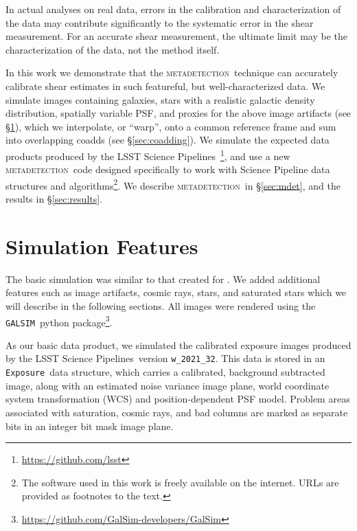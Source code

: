 \documentclass[twocolumn,twocolappendix,astrosym]{openjournal}
\newcommand{\galsim}{\texttt{GALSIM}}
\newcommand{\calexp}{\texttt{Exposure}}
\newcommand{\dm}{LSST Science Pipelines}
\newcommand{\mdet}{\textsc{metadetection}}
\begin{document}
In actual analyses on real data, errors in the calibration and characterization
of the data may contribute significantly to the systematic error in the shear
measurement.  For an accurate shear measurement, the ultimate limit may be the
characterization of the data, not the method itself.

In this work we demonstrate that the \mdet\ technique can accurately calibrate
shear estimates in such featureful, but well-characterized data.  We simulate
images containing galaxies, stars with a realistic galactic density
distribution, spatially variable PSF, and proxies for the above image artifacts
(see \S \ref{sec:sim}), which we interpolate, or ``warp'', onto a common
reference frame and sum into overlapping coadds (see \S \ref{sec:coadding}).
We simulate the expected data products produced by the \dm\
\citep{BoschLSST2019,BoschHSC2017}\footnote{\url{https://github.com/lsst}}, and
use a new \mdet\ code designed specifically to work with Science Pipeline data
structures and algorithms\footnote{The software used in this work is freely
available on the internet.  URLs are provided as footnotes to the text.}.  We
describe \mdet\ in \S \ref{sec:mdet}, and the results in \S \ref{sec:results}.

\section{Simulation Features} \label{sec:sim}

The basic simulation was similar to that created for \citep{mdet20}.  We added
additional features such as image artifacts, cosmic rays, stars, and saturated
stars which we will describe in the following sections.  All images were
rendered using the \galsim\ python
package\footnote{\url{https://github.com/GalSim-developers/GalSim}}.

As our basic data product, we simulated the calibrated exposure images produced
by the \dm\ version \texttt{w\_2021\_32}.  This data is stored in an \calexp\
data structure, which carries a calibrated, background subtracted image, along
with an estimated noise variance image plane, world coordinate system
transformation (WCS) and position-dependent PSF model.  Problem areas
associated with saturation, cosmic rays, and bad columns are marked as separate
bits in an integer bit mask image plane.

\end{document}
